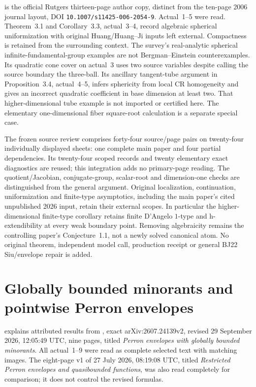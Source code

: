 \cite{Huang06CRLinksAuthorCopy} is the official Rutgers
thirteen-page author copy, distinct from the ten-page 2006
journal layout, DOI \nolinkurl{10.1007/s11425-006-2054-9}.
Actual~1--5 were read. Theorem~3.1 and Corollary~3.3,
actual~3--4, record algebraic spherical uniformization with
original Huang/Huang--Ji inputs left external. Compactness
is retained from the surrounding context. The survey's
real-analytic spherical infinite-fundamental-group examples
are not Bergman--Einstein counterexamples. Its quadratic
cone cover on actual~3 uses two source variables despite
calling the source boundary the three-ball. Its ancillary
tangent-tube argument in Proposition~3.4, actual~4--5,
infers sphericity from local CR homogeneity and gives an
incorrect quadratic coefficient in base dimension at least
two. That higher-dimensional tube example is not imported
or certified here. The elementary one-dimensional fiber
square-root calculation is a separate special case.

The frozen source review comprises forty-four source/page
pairs on twenty-four individually displayed sheets: one
complete main paper and four partial dependencies. Its
twenty-four scoped records and twenty elementary exact
diagnostics are reused; this integration adds no primary-page
reading. The quotient/Jacobian, conjugate-group, scalar-root
and dimension-one checks are distinguished from the general
argument. Original localization, continuation, uniformization
and finite-type asymptotics, including the main paper's cited
unpublished 2026 input, retain their external scopes.
In particular the higher-dimensional finite-type corollary
retains finite D'Angelo $1$-type and h-extendibility at every
weak boundary point. Removing algebraicity remains the
controlling paper's Conjecture~1.1, not a newly solved canonical
atom. No original theorem, independent model call, production
receipt or general BJ22 Siu/envelope repair is added.

\section{Globally bounded minorants and pointwise Perron envelopes}
\label{sec:provenance-bounded-minorants}

 explains attributed results from
\cite{Wikstrom26BoundedMinorantsV2}, exact arXiv:2607.24139v2,
revised 29 September 2026, 12:05:49 UTC, nine pages, titled
\emph{Perron envelopes with globally bounded minorants}.
All actual~1--9 were read as complete selected text with matching images.
The eight-page v1 of 27 July 2026, 08:19:08 UTC, titled
\emph{Restricted Perron envelopes and quasibounded functions}, was also
read completely for comparison; it does not control the revised formulas.

